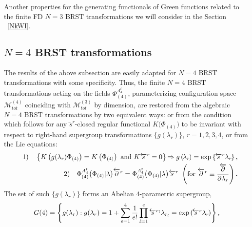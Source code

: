 \documentclass[10pt]{article}
\begin{document}
Another properties for the generating functionals of Green functions  related to the finite FD $N=3$ BRST transformations we will  consider in the Section ~\ref{NkWI}.

\subsection{$N=4$ BRST transformations} \label{N=4gauge}

The results of the above subsection  are easily adapted for $N=4$ BRST transformations with some specificity.
Thus,
the finite $N=4$ BRST transformations acting on the fields ${\Phi}{}^{A^t_4}_{(4)}$, parameterizing  configuration space $\mathcal{M}^{(4)}_{tot}$ coinciding with $\mathcal{M}^{(3)}_{tot}$ by dimension,  are restored
from the algebraic  $N=4$ BRST transformations
 by two equivalent ways:  or from the condition which follows  for any
$\overleftarrow{s}^{r }$-closed regular functional $K\big({\Phi}_{(4)} \big)$
to be invariant with respect to right-hand supergroup transformations $\{g(\lambda_r)\}$, $r=1,2,3,4$,  or  from
the {Lie equations}:
\begin{eqnarray}
&&1) \quad \left\{ K\left( g(\lambda_r){\Phi}_{(4)} \right) =K\left( {\Phi}_{(4)}
\right) \ \mathrm{and}\ K\overleftarrow{s}{}^{r}=0\right\} \hspace{-0.1em}%
\Rightarrow g\left( \hspace{-0.1em}\lambda_{r}\hspace{-0.1em}\right) = \exp \left\{ \hspace{-0.1em}\overleftarrow{s%
}{}^{r}\lambda_{r}\hspace{-0.1em}\right\} ,  \label{bab4}
\\
&&2) \quad   {\Phi}{}^{A^t_4}_{(4)} \big({\Phi}_{(4)}|\lambda \big)\overleftarrow{\partial }^{r} ={\Phi}{}^{A^t_4}_{(4)}\big({\Phi}_{(4)}|\lambda\big)%
\overleftarrow{s}^{r}\ \left( \mathrm{for}\ \overleftarrow{\partial }%
^{r}\equiv \frac{\overleftarrow{\partial }}{\partial \lambda_{r}}\right).
\label{Lieeq4}
\end{eqnarray}
The set of such  $\{g(\lambda_r)\}$ forms an Abelian  $4$-parametric  supergroup,
\begin{equation}\label{N4finBRST}
G(4) = \left\{g(\lambda_r)
: g(\lambda_r)= 1 + \sum_{e=1}^4 \frac{1}{e!}\prod_{l=1}^e\overleftarrow{s}{}^{r_l}\lambda_{r_l}   = \exp \left( \hspace{-0.1em}\overleftarrow{s%
}{}^{r}\lambda_{r}\hspace{-0.1em}\right)\right\},
\end{equation}
\end{document}
